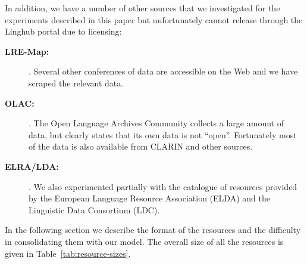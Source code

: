 \documentclass[smallextended]{svjour3}       %
\begin{document}
In addition, we have a number of other sources that we investigated for the
experiments described in this paper but unfortunately cannot release through the
Linghub portal due to licensing:

\begin{description}
    \item[\textbf{LRE-Map:}]. Several other conferences of data are accessible on the Web
        and we have scraped the relevant data.
    \item[\textbf{OLAC:}]. The Open Language Archives Community collects a large amount of
        data, but clearly states that its own data is not ``open''. Fortunately
        most of the data is also available from CLARIN and other sources.
    \item[\textbf{ELRA/LDA:}]. We also experimented partially with the catalogue of
        resources provided by the European Language Resource Association (ELDA) and the Linguistic Data Consortium (LDC).
\end{description}

In the following section we describe the format of the resources and the
difficulty in consolidating them with our model. The overall size of all the
resources is given in Table~\ref{tab:resource-sizes}.

\begin{table}
    \caption{\label{tab:resource-sizes}The sizes of the resources in terms of
    number of metadata records and total data size}
\end{table}
\end{document}
